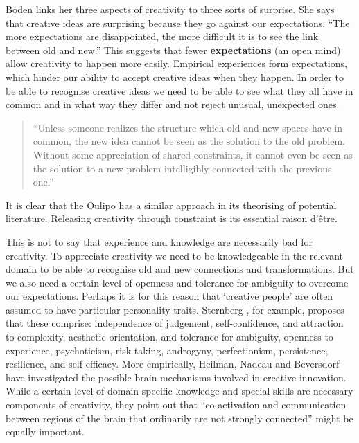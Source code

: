 Boden links her three aspects of creativity to three sorts of surprise. She says that creative ideas are surprising because they go against our expectations. ``The more expectations are disappointed, the more difficult it is to see the link between old and new.'' \autocite[p.84]{Boden2003} This suggests that fewer \textbf{expectations} (an open mind) allow creativity to happen more easily. Empirical experiences form expectations, which hinder our ability to accept creative ideas when they happen. In order to be able to recognise creative ideas we need to be able to see what they all have in common and in what way they differ and not reject unusual, unexpected ones.

\begin{quote}
  ``Unless someone realizes the structure which old and new spaces have in common, the new idea cannot be seen as the solution to the old problem. Without some appreciation of shared constraints, it cannot even be seen as the solution to a new problem intelligibly connected with the previous one.'' \autocite[p.84]{Boden2003}
\end{quote}

It is clear that the Oulipo has a similar approach in its theorising of potential literature. Releasing creativity through constraint is its essential raison d'être.

This is not to say that experience and knowledge are necessarily bad for creativity. To appreciate creativity we need to be knowledgeable in the relevant domain to be able to recognise old and new connections and transformations. But we also need a certain level of openness and tolerance for ambiguity to overcome our expectations. Perhaps it is for this reason that `creative people' are often assumed to have particular personality traits. Sternberg \autocite{Sternberg1999, Sternberg1999}, for example, proposes that these comprise: independence of judgement, self-confidence, and attraction to complexity, aesthetic orientation, and tolerance for ambiguity, openness to experience, psychoticism, risk taking, androgyny, perfectionism, persistence, resilience, and self-efficacy. More empirically, Heilman, Nadeau and Beversdorf \autocite{Heilman2003} have investigated the possible brain mechanisms involved in creative innovation. While a certain level of domain specific knowledge and special skills are necessary components of creativity, they point out that ``co-activation and communication between regions of the brain that ordinarily are not strongly connected'' might be equally important.

